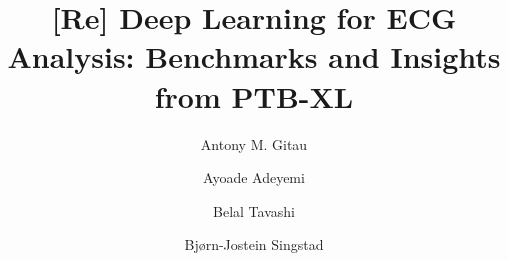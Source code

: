 \def \codeURL{https://github.com/rescience-c/template}
\def \codeDOI{}
\def \dataURL{https://physionet.org/content/ptb-xl/1.0.3/}
\def \dataDOI{10.13026/kfzx-aw45}
\def \editorNAME{}
\def \editorORCID{}
\def \reviewerINAME{}
\def \reviewerIORCID{}
\def \reviewerIINAME{}
\def \reviewerIIORCID{}
\def \dateRECEIVED{}
\def \dateACCEPTED{}
\def \datePUBLISHED{}
\def \articleTITLE{[Re] Deep Learning for ECG Analysis: Benchmarks
and Insights from PTB-XL }
\def \articleTYPE{Replication / Deep Learning for ECG Analysis}
\def \articleDOMAIN{Time series classification}
\def \articleBIBLIOGRAPHY{bibliography.bib}
\def \articleYEAR{2023}
\def \reviewURL{}
\def \articleABSTRACT{}
\def \replicationCITE{}
\def \replicationBIB{}
\def \replicationURL{}
\def \replicationDOI{}
\def \contactNAME{Bjørn-Jostein Singstad}
\def \contactEMAIL{b.j.singstad@fys.uio.no}
\def \articleKEYWORDS{ECG, Time series classification, 1D CNN}
\def \journalNAME{ReScience C}
\def \journalVOLUME{}
\def \journalISSUE{}
\def \articleNUMBER{}
\def \articleDOI{}
\def \authorsFULL{Antony M. Gitau, Ayoade Adeyemi, Belal Tavashi and Bjørn-Jostein Singstad}
\def \authorsABBRV{A.M.Gitau, A.Adeyemi, B.Tavashi \& B.J.Singstad}
\def \authorsSHORT{Gitau, Adeyemi, Tavashi \& Singstad}
\title{\articleTITLE}
\date{}
\author[1,\orcid{0009-0005-6106-3747}]{Antony M. Gitau}
\author[2,\orcid{0000-0000-0000-0000}]{Ayoade Adeyemi}
\author[3,\orcid{0000-0000-0000-0000}]{Belal Tavashi}
\author[4,5,6,\orcid{0000-0003-4055-4297}]{Bjørn-Jostein Singstad}
